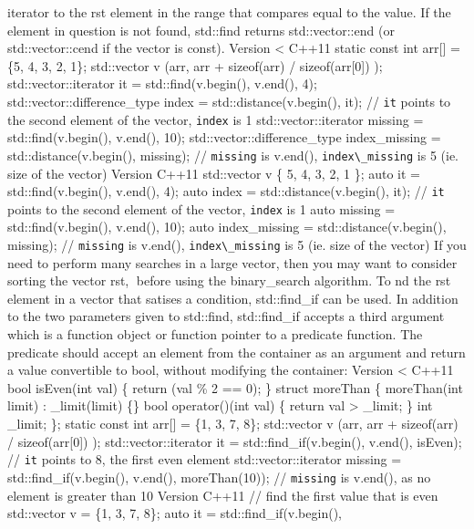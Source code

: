 iterator to the rst element in the range that compares equal to the
value. If the element in question is not found, std::find returns
std::vector::end (or std::vector::cend if the vector is const). Version
\textless{} C++11 static const int arr{[}{]} = \{5, 4, 3, 2, 1\};
std::vector v (arr, arr + sizeof(arr) / sizeof(arr{[}0{]}) );
std::vector::iterator it = std::find(v.begin(), v.end(), 4);
std::vector::difference\_type index = std::distance(v.begin(), it); //
\passthrough{\lstinline!it!} points to the second element of the vector,
\passthrough{\lstinline!index!} is 1 std::vector::iterator missing =
std::find(v.begin(), v.end(), 10); std::vector::difference\_type
index\_missing = std::distance(v.begin(), missing); //
\passthrough{\lstinline!missing!} is v.end(),
\passthrough{\lstinline!index\_missing!} is 5 (ie. size of the vector)
Version C++11 std::vector v \{ 5, 4, 3, 2, 1 \}; auto it =
std::find(v.begin(), v.end(), 4); auto index = std::distance(v.begin(),
it); // \passthrough{\lstinline!it!} points to the second element of the
vector, \passthrough{\lstinline!index!} is 1 auto missing =
std::find(v.begin(), v.end(), 10); auto index\_missing =
std::distance(v.begin(), missing); // \passthrough{\lstinline!missing!}
is v.end(), \passthrough{\lstinline!index\_missing!} is 5 (ie. size of
the vector) If you need to perform many searches in a large vector, then
you may want to consider sorting the vector rst, before using the
binary\_search algorithm. To nd the rst element in a vector that satises
a condition, std::find\_if can be used. In addition to the two
parameters given to std::find, std::find\_if accepts a third argument
which is a function object or function pointer to a predicate function.
The predicate should accept an element from the container as an argument
and return a value convertible to bool, without modifying the container:
Version \textless{} C++11 bool isEven(int val) \{ return (val \% 2 ==
0); \} struct moreThan \{ moreThan(int limit) : \_limit(limit) \{\} bool
operator()(int val) \{ return val \textgreater{} \_limit; \} int
\_limit; \}; static const int arr{[}{]} = \{1, 3, 7, 8\}; std::vector v
(arr, arr + sizeof(arr) / sizeof(arr{[}0{]}) ); std::vector::iterator it
= std::find\_if(v.begin(), v.end(), isEven); //
\passthrough{\lstinline!it!} points to 8, the first even element
std::vector::iterator missing = std::find\_if(v.begin(), v.end(),
moreThan(10)); // \passthrough{\lstinline!missing!} is v.end(), as no
element is greater than 10 Version C++11 // find the first value that is
even std::vector v = \{1, 3, 7, 8\}; auto it = std::find\_if(v.begin(),
